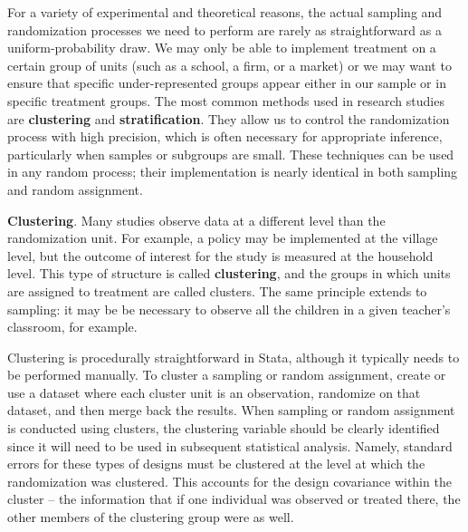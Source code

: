 For a variety of experimental and theoretical reasons,
the actual sampling and randomization processes we need to perform
are rarely as straightforward as a uniform-probability draw.
We may only be able to implement treatment on a certain group of units
(such as a school, a firm, or a market)
or we may want to ensure that specific under-represented groups appear
either in our sample or in specific treatment groups.
The most common methods used in research studies
are \textbf{clustering} and \textbf{stratification}.
They allow us to control the randomization process with high precision,
which is often necessary for appropriate inference,
particularly when samples or subgroups are small.\cite{athey2017econometrics}
These techniques can be used in any random process;
their implementation is nearly identical in both sampling and random assignment.

\textbf{Clustering}. Many studies observe data at a different level than the randomization unit.
For example, a policy may be implemented at the village level,
but the outcome of interest for the study is measured at the household level.
This type of structure is called \textbf{clustering},
and the groups in which units are assigned to treatment are called clusters.
The same principle extends to sampling:
it may be be necessary to observe all the children
in a given teacher's classroom, for example.

Clustering is procedurally straightforward in Stata,
although it typically needs to be performed manually.
To cluster a sampling or random assignment,
create or use a dataset where each cluster unit is an observation,
randomize on that dataset, and then merge back the results.
When sampling or random assignment is conducted using clusters,
the clustering variable should be clearly identified
since it will need to be used in subsequent statistical analysis.
Namely, standard errors for these types of designs must be clustered
at the level at which the randomization was clustered.
This accounts for the design covariance within the cluster --
the information that if one individual was observed or treated there,
the other members of the clustering group were as well.

